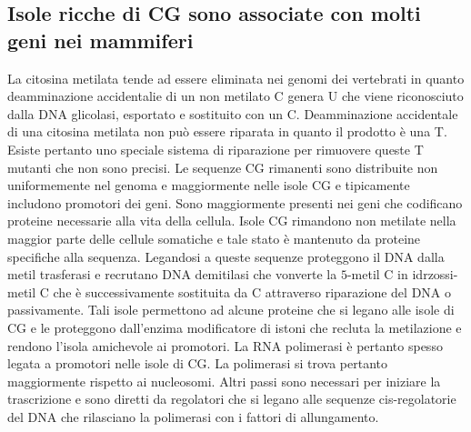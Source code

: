 \subsection{Isole ricche di CG sono associate con molti geni nei mammiferi}
La citosina metilata tende ad essere eliminata nei genomi dei vertebrati in quanto deamminazione accidentalie di un non metilato C genera U che viene riconosciuto dalla DNA glicolasi, 
esportato e sostituito con un C. Deamminazione accidentale di una citosina metilata non pu\`o essere riparata in quanto il prodotto \`e una T. Esiste pertanto uno speciale sistema di
riparazione per rimuovere queste T mutanti che non sono precisi. Le sequenze CG rimanenti sono distribuite non uniformemente nel genoma e maggiormente nelle isole CG e tipicamente 
includono promotori dei geni. Sono maggiormente presenti nei geni che codificano proteine necessarie alla vita della cellula. Isole CG rimandono non metilate nella maggior parte delle
cellule somatiche e tale stato \`e mantenuto da proteine specifiche alla sequenza. Legandosi a queste sequenze proteggono il DNA dalla metil trasferasi e recrutano DNA demitilasi che
vonverte la $5$-metil C in idrzossi-metil C che \`e successivamente sostituita da C attraverso riparazione del DNA o passivamente. Tali isole permettono ad alcune proteine che si legano
alle isole di CG e le proteggono dall'enzima modificatore di istoni che recluta la metilazione e rendono l'isola amichevole ai promotori. La RNA polimerasi \`e pertanto spesso
legata a promotori nelle isole di CG. La polimerasi si trova pertanto maggiormente rispetto ai nucleosomi. Altri passi sono necessari per iniziare la trascrizione e sono diretti da
regolatori che si legano alle sequenze cis-regolatorie del DNA che rilasciano la polimerasi con i fattori di allungamento.
